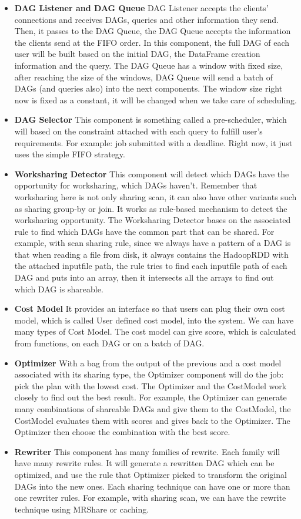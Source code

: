 \begin{itemize}
\item \textbf{DAG Listener and DAG Queue} DAG Listener accepts the clients’ connections and receives DAGs, queries and other information they send. Then, it passes to the DAG Queue, the DAG Queue accepts the information the clients send at the FIFO order. In this component, the full DAG of each user will be built based on the initial DAG, the DataFrame creation information and the query. The DAG Queue has a window with fixed size, after reaching the size of the windows, DAG Queue will send a batch of DAGs (and queries also) into the next components. The window size right now is fixed as a constant, it will be changed when we take care of scheduling.
\item \textbf{DAG Selector} This component is something called a pre-scheduler, which will based on the constraint attached with each query to fulfill user’s requirements. For example: job submitted with a deadline. Right now, it just uses the simple FIFO strategy.
\item \textbf{Worksharing Detector} This component will detect which DAGs have the opportunity for worksharing, which DAGs haven’t. Remember that worksharing here is not only sharing scan, it can also have other variants such as sharing group-by or join. It works as rule-based mechanism to detect the worksharing opportunity. The Worksharing Detector bases on the associated rule to find which DAGs have the common part that can be shared. For example, with scan sharing rule, since we always have a pattern of a DAG is that when reading a file from disk, it always contains the HadoopRDD with the attached inputfile path, the rule tries to find each inputfile path of each DAG and puts into an array, then it intersects all the arrays to find out which DAG is shareable.
\item \textbf{Cost Model} It provides an interface so that users can plug their own cost model, which is called User defined cost model, into the system. We can have many types of Cost Model. The cost model can give score, which is calculated from functions, on each DAG or on a batch of DAG.
\item \textbf{Optimizer} With a bag from the output of the previous and a cost model associated with its sharing type, the Optimizer component will do the job: pick the plan with the lowest cost. The Optimizer and the CostModel work closely to find out the best result. For example, the Optimizer can generate many combinations of shareable DAGs and give them to the CostModel, the CostModel evaluates them with scores and gives back to the Optimizer. The Optimizer then choose the combination with the best score.
\item \textbf{Rewriter} This component has many families of rewrite. Each family will have many rewrite rules. It will generate a rewritten DAG which can be optimized, and use the rule that Optimizer picked to transform the original DAGs into the new ones. Each sharing technique can have one or more than one rewriter rules. For example, with sharing scan, we can have the rewrite technique using MRShare or caching.
\end{itemize}


